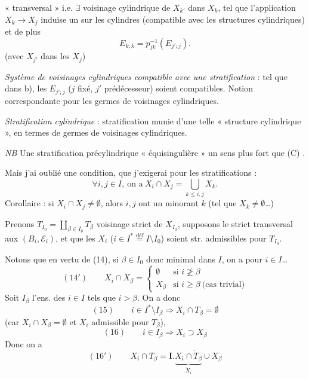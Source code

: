 \documentclass[11pt,a4paper]{article}
\begin{document}

 « transversal » i.e. $\exists$ voisinage cylindrique   de $X_{k'}$ dans $X_k$, tel que l'application $X_k\to X_j$ induise un   sur les cylindres (compatible avec les structures cylindriques) et de plus
\[
E_{k;k}=p_{jk}^{-1}(E_{j';j}) .
\]
(avec $X_{j'}$ dans les $X_j$)

\emph{Système de voisinages cylindriques} \struck{\ill{}} \emph{compatible avec une stratification} : tel que dans b), les $E_{j';j}$ ($j$ fixé, $j'$ prédécesseur) soient compatibles. Notion correspondante pour les germes de voisinages cylindriques.

\emph{Stratification cylindrique} : stratification munie d'une telle « structure cylindrique », en termes de germes de voisinages cylindriques.


\emph{NB} Une stratification précylindrique    « équisingulière » \ill{} un sens \ill{} plus fort que \ill{} \ill{} (C) .

Mais j'ai oublié une condition, que j'exigerai pour les stratifications :
\[
\forall i,j\in I,\ \text{on a}\ X_i\cap X_j=\bigcup_{k\le i,j}X_k .
\]
Corollaire : si $X_i\cap X_j\neq\emptyset$, alors $i,j$ ont un minorant $k$ (tel que $X_k\neq\emptyset$\ldots)



Prenons $T_{I_0}=\coprod_{\beta\in I_0}T_\beta$ voisinage \struck{\ill{}}  strict de $X_{I_0}$, supposons le strict transversal aux $(B_i,\mathcal E_i)$, et  que les $X_i$ ($i\in I^{*}\overset{\text{déf}}{=}I\setminus I_0$) soient str. admissibles pour $T_{I_0}$.

Notons que en vertu de (14), si $\beta\in I_0$ donc minimal dans $I$, on a pour $i\in I$\ldots
\[
(14')\qquad X_i\cap X_\beta=
\begin{cases}
\emptyset & \text{si } i\not\ge\beta\\
X_\beta & \text{si } i\ge\beta\ \text{(cas trivial)}
\end{cases}
\]
Soit $I_\beta$  l'ens. des $i\in I$ tels que $i>\beta$. On a donc
\[
(15)\qquad i\in I^{*}\setminus I_\beta\Longrightarrow X_i\cap T_\beta=\emptyset
\]
(car $X_i\cap X_\beta=\emptyset$ et $X_i$ admissible pour $T_\beta$),
\[
(16)\qquad i\in I_\beta\Longrightarrow X_i\supset X_\beta
\]
Donc on a
\[
(16')\qquad X_i\cap T_\beta=\mathbf{I}.\underbrace{X_i\cap\dot T_\beta}_{\dot X_i}\cup X_\beta
\]
\end{document}

